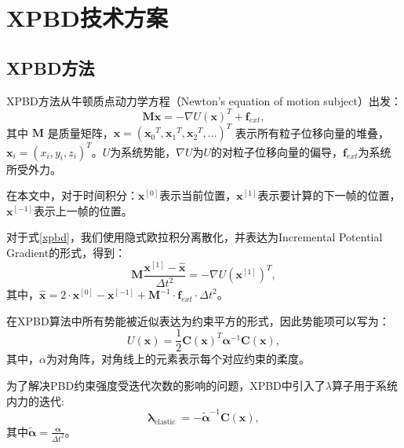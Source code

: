 \section{XPBD技术方案}

\subsection{XPBD方法}
XPBD方法\cite{xpbd2016}从牛顿质点动力学方程（Newton's equation of motion subject）出发：
\begin{equation}
	\mathbf{M} \ddot{\mathbf{x}}=-\nabla U\left(\mathbf{x}\right)^T + \mathbf{f}_{ext},
	\label{xpbd}
\end{equation}
其中 $\mathbf{M}$ 是质量矩阵，$\mathbf{x}=\left({\mathbf{x}_0}^T,{\mathbf{x}_1}^T,{\mathbf{x}_2}^T,...\right)^T$ 表示所有粒子位移向量的堆叠，$\mathbf{x}_i=\left(x_i,y_i,z_i\right)^T $。$U$为系统势能，$\nabla U$为$U$的对粒子位移向量的偏导，$\mathbf{f}_{ext}$为系统所受外力。

在本文中，对于时间积分：$\mathbf{x}^{[0]}$表示当前位置，$\mathbf{x}^{[1]}$表示要计算的下一帧的位置，$\mathbf{x}^{[-1]}$表示上一帧的位置。

对于式\eqref{xpbd}，我们使用隐式欧拉积分离散化，并表达为Incremental Potential Gradient的形式，得到：
\begin{equation}
	\mathbf{M}\frac{\mathbf{x}^{[1]}-\hat{\mathbf{x}}}{\Delta t^2}=-\nabla U\left(\mathbf{x}^{[1]}\right)^T,
\end{equation}
其中，$\hat{\mathbf{x}}= 2 \cdot \mathbf{x}^{[0]}- \mathbf{x}^{[-1]} + \mathbf{M}^{-1} \cdot \mathbf{f}_{ext} \cdot {\Delta t}^2$。

在XPBD算法中所有势能被近似表达为约束平方的形式，因此势能项可以写为：
\begin{equation}
	U\left(\mathbf{x}\right)=\frac{1}{2} \mathbf{C}\left(\mathbf{x}\right)^{T} \boldsymbol{\alpha}^{-1} \mathbf{C}\left(\mathbf{x}\right),
\end{equation}
其中，$\alpha$为对角阵，对角线上的元素表示每个对应约束的柔度。

为了解决PBD约束强度受迭代次数的影响的问题，XPBD中引入了$\lambda$算子用于系统内力的迭代:
\begin{equation}
	\boldsymbol{\lambda}_{\text {elastic }}=-\boldsymbol{\tilde{\alpha}}^{-1} \mathbf{C}\left(\mathbf{x}\right),
\end{equation}
其中$\boldsymbol{\tilde{\alpha}}=\frac{\boldsymbol{\alpha}}{\Delta t^2}$。

